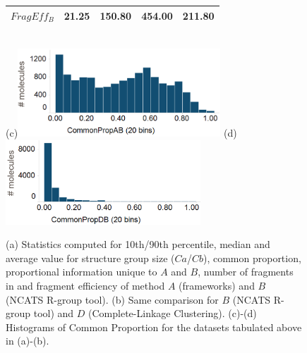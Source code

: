 \documentclass[journal=jacsat,biochem,manuscript=article]{achemso}
\begin{document}
\begin{figure}
\begin{minipage}[c]{\linewidth}
{\begin{tabular}{|c|ccc|c|}
    {\bf $FragEff_B$} & 21.25 & 150.80 & 454.00 & 211.80 \\
    \hline
  \end{tabular}
 }\\
    (c)\includegraphics[height=1.3in]{fig/CP_TCAMS_GSKFW_RGT_v2.png}
    (d)\includegraphics[height=1.25in]{fig/CP_TCAMS_CLink_RGT_v3.png}\\
    
  \end{minipage}
  \caption{(a) Statistics computed for 10th/90th percentile, median and average value for structure group size ($Ca$/$Cb$), common proportion, proportional information unique to $A$ and $B$, number of fragments in and fragment efficiency of method $A$ (frameworks) and $B$ (NCATS R-group tool). (b) Same comparison for $B$ (NCATS R-group tool) and $D$ (Complete-Linkage Clustering). (c)-(d) Histograms of Common Proportion for the datasets tabulated above in (a)-(b).}
\label{fig:statcomparetable}
\end{figure}
\end{document}

